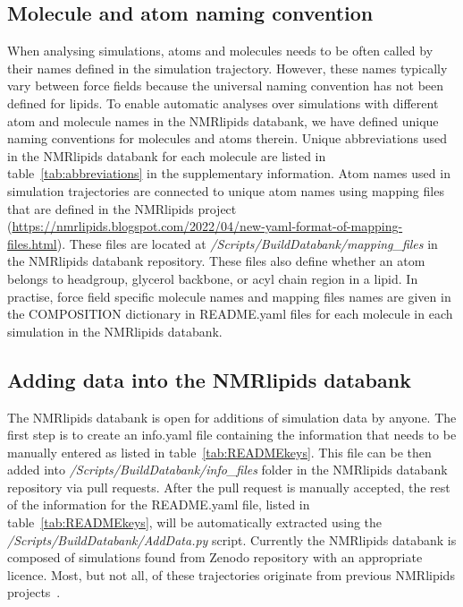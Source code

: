 \documentclass[fleqn,10pt]{wlscirep}
\begin{document}
\subsection{Molecule and atom naming convention} \label{naming}
When analysing simulations, atoms and molecules needs to be often called by their names defined in the simulation trajectory. However, these names typically vary between force fields because the universal naming convention has not been defined for lipids. To enable automatic analyses over simulations with different atom and molecule names in the NMRlipids databank, we have defined unique naming conventions for molecules and atoms therein. Unique abbreviations used in the NMRlipids databank for each molecule are listed in table~\ref{tab:abbreviations} in the supplementary information. Atom names used in simulation trajectories are connected to unique atom names using mapping files that are defined in the NMRlipids project (\url{https://nmrlipids.blogspot.com/2022/04/new-yaml-format-of-mapping-files.html}). These files are located at {\it /Scripts/BuildDatabank/mapping\_files} in the NMRlipids databank repository. These files also define whether an atom belongs to headgroup, glycerol backbone, or acyl chain region in a lipid. In practise, force field specific molecule names and mapping files
names are given in the COMPOSITION dictionary in README.yaml files for each molecule in each simulation in the NMRlipids databank.

\subsection{Adding data into the NMRlipids databank}
The NMRlipids databank is open for additions of simulation data by anyone. The first step is to create an info.yaml file containing the information that needs to be manually entered as listed in table~\ref{tab:READMEkeys}. This file can be then added into {\it /Scripts/BuildDatabank/info\_files} folder in the NMRlipids databank repository via pull requests. After the pull request is manually accepted, the rest of the information for the README.yaml file, listed in table~\ref{tab:READMEkeys}, will be automatically extracted using the {\it /Scripts/BuildDatabank/AddData.py} script. Currently the NMRlipids databank is composed of simulations found from Zenodo repository with an appropriate licence. Most, but not all, of these trajectories originate from previous NMRlipids projects~\cite{botan15,catte16,antila19,bacle21}.
\end{document}

